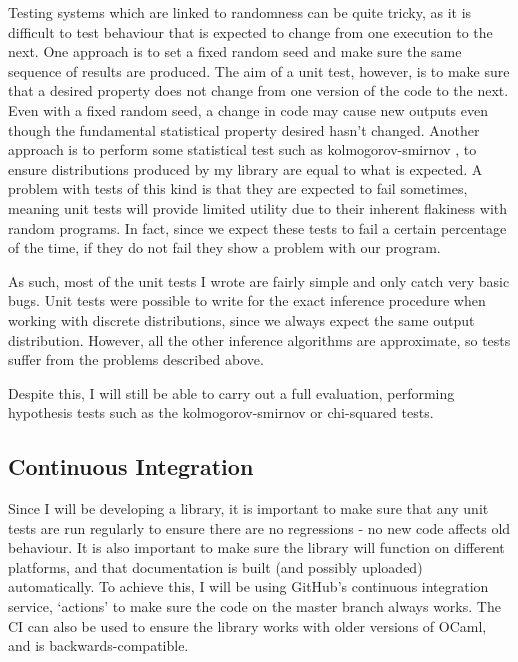 Testing systems which are linked to randomness can be quite tricky, as it is difficult to test behaviour that is expected to change from one execution to the next. One approach is to set a fixed random seed and make sure the same sequence of results are produced. The aim of a unit test, however, is to make sure that a desired property does not change from one version of the code to the next. Even with a fixed random seed, a change in code may cause new outputs even though the fundamental statistical property desired hasn't changed. Another approach is to perform some statistical test such as kolmogorov-smirnov \cite{}, to ensure distributions produced by my library are equal to what is expected. A problem with tests of this kind is that they are expected to fail sometimes, meaning unit tests will provide limited utility due to their inherent flakiness with random programs. In fact, since we expect these tests to fail a certain percentage of the time, if they do not fail they show a problem with our program.

As such, most of the unit tests I wrote are fairly simple and only catch very basic bugs. Unit tests were possible to write for the exact inference procedure when working with discrete distributions, since we always expect the same output distribution. However, all the other inference algorithms are approximate, so tests suffer from the problems described above.

Despite this, I will still be able to carry out a full evaluation, performing hypothesis tests such as the kolmogorov-smirnov or chi-squared tests.


\subsection{Continuous Integration}
Since I will be developing a library, it is important to make sure that any unit tests are run regularly to ensure there are no regressions - no new code affects old behaviour. It is also important to make sure the library will function on different platforms, and that documentation is built (and possibly uploaded) automatically. To achieve this, I will be using GitHub's continuous integration service, `actions' to make sure the code on the master branch always works. The CI can also be used to ensure the library works with older versions of OCaml, and is backwards-compatible.

